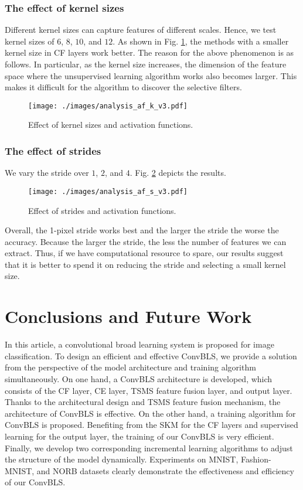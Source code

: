 \documentclass[lettersize,journal]{IEEEtran}
\begin{document}
\subsubsection{The effect of kernel sizes}
Different kernel sizes can capture features of different scales. Hence, we test kernel sizes of $6$, $8$, $10$, and $12$. As shown in Fig. \ref{fig:analysis:af_k}, the methods with a smaller kernel size in CF layers work better. The reason for the above phenomenon is as follows. In particular, as the kernel size increases, the dimension of the feature space where the unsupervised learning algorithm works also becomes larger. This makes it difficult for the algorithm to discover the selective filters.

\begin{figure}[!t]
\centering
\texttt{[image: ./images/analysis\_af\_k\_v3.pdf]}
\caption{Effect of kernel sizes and activation functions.}
\label{fig:analysis:af_k}
\end{figure}

\subsubsection{The effect of strides}
We vary the stride over $1$, $2$, and $4$. Fig. \ref{fig:analysis:af_s} depicts the results.
\begin{figure}[!t]
\centering
\texttt{[image: ./images/analysis\_af\_s\_v3.pdf]}
\caption{Effect of strides and activation functions.}
\label{fig:analysis:af_s}
\end{figure}
Overall, the 1-pixel stride works best and the larger the stride the worse the accuracy. Because the larger the stride, the less the number of features we can extract. Thus, if we have computational resource to spare, our results suggest that it is better to spend it on reducing the stride and selecting a small kernel size.

\section{Conclusions and Future Work}
In this article, a convolutional broad learning system is proposed for image classification. To design an efficient and effective ConvBLS, we provide a solution from the perspective of the model architecture and training algorithm simultaneously. On one hand, a ConvBLS architecture is developed, which consists of the CF layer, CE layer, TSMS feature fusion layer, and output layer. Thanks to the architectural design and TSMS feature fusion mechanism, the architecture of ConvBLS is effective. On the other hand, a training algorithm for ConvBLS is proposed. Benefiting from 
the SKM for the CF layers and supervised learning for the output layer, the training of our ConvBLS is very efficient. Finally, we develop two corresponding incremental learning algorithms to adjust the structure of the model dynamically. Experiments on MNIST, Fashion-MNIST, and NORB datasets clearly demonstrate the effectiveness and efficiency of our ConvBLS.
\end{document}
